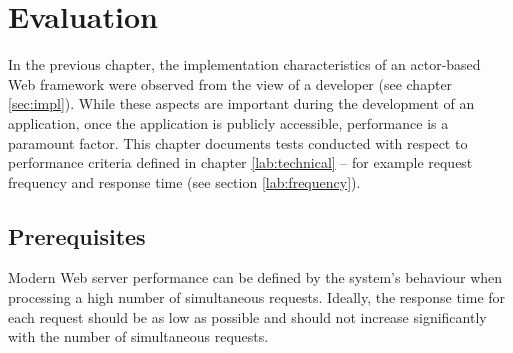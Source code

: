 \chapter{Evaluation}
\label{lab:eval}

In the previous chapter, the implementation characteristics of an actor-based Web framework were observed from the view of a developer (see chapter \ref{sec:impl}). While these aspects are important during the development of an application, once the application is publicly accessible, performance is a paramount factor. This chapter documents tests conducted with respect to performance criteria defined in chapter \ref{lab:technical} -- for example request frequency and response time (see section \ref{lab:frequency}).

\section{Prerequisites}

Modern Web server performance can be defined by the system's behaviour when processing a high number of simultaneous requests. Ideally, the response time for each request should be as low as possible and should not increase significantly with the number of simultaneous requests. 


